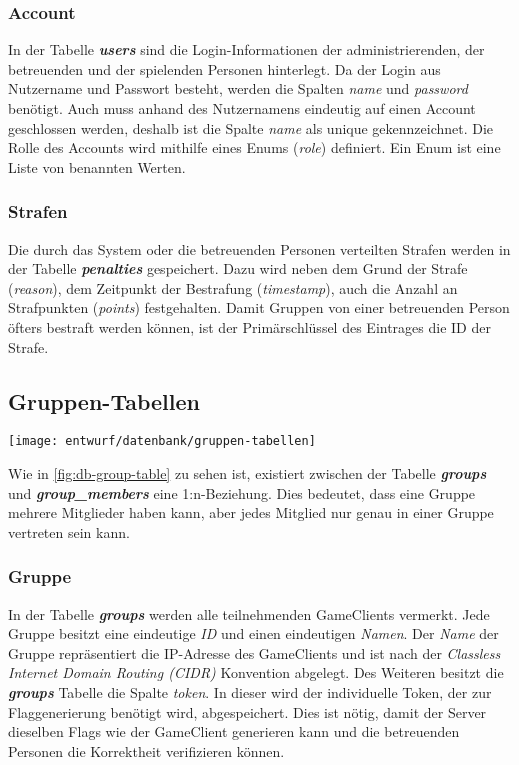 \subsubsection{Account}
In der Tabelle \textbf{\textit{users}} sind die Login-Informationen der administrierenden, der betreuenden und der spielenden Personen hinterlegt. Da der Login aus Nutzername und Passwort besteht, werden die Spalten \textit{name} und \textit{password} benötigt. Auch muss anhand des Nutzernamens eindeutig auf einen Account geschlossen werden, deshalb ist die Spalte \textit{name} als unique gekennzeichnet. Die Rolle des Accounts wird mithilfe eines Enums (\textit{role}) definiert. Ein Enum ist eine Liste von benannten Werten.

\subsubsection{Strafen}
Die durch das System oder die betreuenden Personen verteilten Strafen werden in der Tabelle \textbf{\textit{penalties}} gespeichert. Dazu wird neben dem Grund der Strafe (\textit{reason}), dem Zeitpunkt der Bestrafung (\textit{timestamp}), auch die Anzahl an Strafpunkten (\textit{points}) festgehalten. Damit Gruppen von einer betreuenden Person öfters bestraft werden können, ist der Primärschlüssel des Eintrages die ID der Strafe.

\subsection{Gruppen-Tabellen}
\begin{center}
	\texttt{[image: entwurf/datenbank/gruppen-tabellen]}
	\label{fig:db-group-table}
\end{center}

Wie in \autoref{fig:db-group-table} zu sehen ist, existiert zwischen der Tabelle \textbf{\textit{groups}} und \textbf{\textit{group\_members}} eine 1:n-Beziehung. Dies bedeutet, dass eine Gruppe mehrere Mitglieder haben kann, aber jedes Mitglied nur genau in einer Gruppe vertreten sein kann.

\subsubsection{Gruppe}
In der Tabelle \textbf{\textit{groups}} werden alle teilnehmenden GameClients vermerkt. Jede Gruppe besitzt eine eindeutige \textit{ID} und einen eindeutigen \textit{Namen}. Der \textit{Name} der Gruppe repräsentiert die IP-Adresse des GameClients und ist nach der \textit{Classless Internet Domain Routing (CIDR)} Konvention abgelegt. Des Weiteren besitzt die \textbf{\textit{groups}} Tabelle die Spalte \textit{token}. In dieser wird der individuelle Token, der zur Flaggenerierung benötigt wird, abgespeichert. Dies ist nötig, damit der Server dieselben Flags wie der GameClient generieren kann und die betreuenden Personen die Korrektheit verifizieren können.

